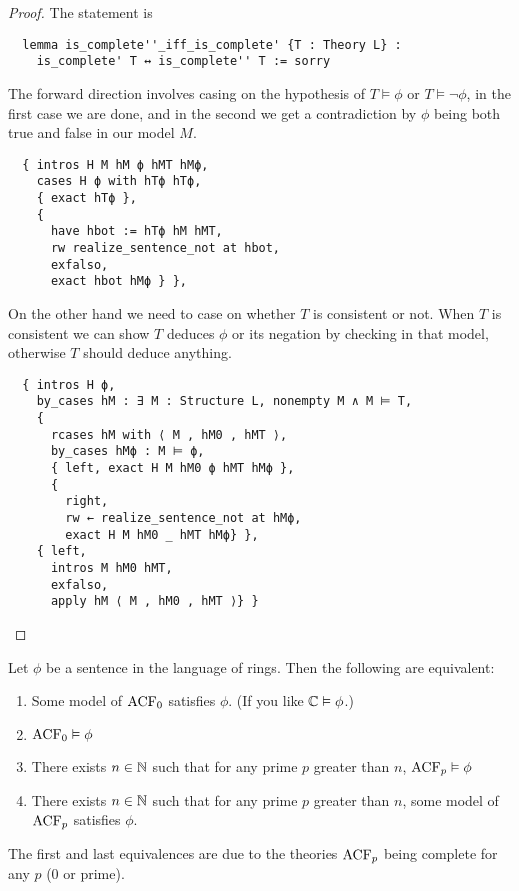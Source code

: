 \begin{proof}
  The statement is
\begin{lstlisting}
  lemma is_complete''_iff_is_complete' {T : Theory L} :
    is_complete' T ↔ is_complete'' T := sorry \end{lstlisting}
  The forward direction involves casing on the hypothesis of $T \vDash \phi$
  or $T \vDash \neg \phi$, in the first case we are done,
  and in the second we get a contradiction by
  $\phi$ being both true and false in our model $M$.
\begin{lstlisting}
  { intros H M hM ϕ hMT hMϕ,
    cases H ϕ with hTϕ hTϕ,
    { exact hTϕ },
    {
      have hbot := hTϕ hM hMT,
      rw realize_sentence_not at hbot,
      exfalso,
      exact hbot hMϕ } },
\end{lstlisting}
    On the other hand we need to case on whether $T$
    is consistent or not.
    When $T$ is consistent we can show $T$ deduces
    $\phi$ or its negation by checking in that model,
    otherwise $T$ should deduce anything.
\begin{lstlisting}
  { intros H ϕ,
    by_cases hM : ∃ M : Structure L, nonempty M ∧ M ⊨ T,
    {
      rcases hM with ⟨ M , hM0 , hMT ⟩,
      by_cases hMϕ : M ⊨ ϕ,
      { left, exact H M hM0 ϕ hMT hMϕ },
      {
        right,
        rw ← realize_sentence_not at hMϕ,
        exact H M hM0 _ hMT hMϕ} },
    { left,
      intros M hM0 hMT,
      exfalso,
      apply hM ⟨ M , hM0 , hMT ⟩} } \end{lstlisting}
\end{proof}

\begin{prop}
    Let $\phi$ be a sentence in the language of rings.
    Then the following are equivalent:
    \begin{enumerate}
        \item Some model of $\operatorname{ACF}_0$ satisfies $\phi$.
        (If you like $\mathbb{C} \vDash \phi$.)
        \item $\operatorname{ACF}_0 \vDash \phi$
        \item There exists $n \in \mathbb{N}$ such that for any prime $p$
            greater than $n$, $\operatorname{ACF}_p \vDash \phi$
        \item There exists $n \in \mathbb{N}$ such that for any prime $p$
        greater than $n$, some model of $\operatorname{ACF}_p$ satisfies $\phi$.
    \end{enumerate}
    The first and last equivalences are due to the theories $\operatorname{ACF}_{p}$
    being complete for any $p$ ($0$ or prime).
\end{prop}

